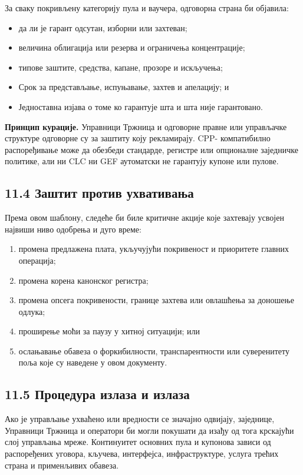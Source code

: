 \documentclass[11pt]{article}
\begin{document}
За сваку покривљену категорију пула и ваучера, одговорна страна би објавила:

\begin{itemize}[leftmargin=*]
\item да ли је гарант одсутан, изборни или захтеван;
\item величина облигација или резерва и ограничења концентрације;
\item типове заштите, средства, капане, прозоре и искључења;
\item Срок за представљање, испуњавање, захтев и апелацију; и
\item Једноставна изјава о томе ко гарантује шта и шта није гарантовано.
\end{itemize}
\textbf{Принцип курације.} Управници Тржница и одговорне правне или управљачке структуре одговорне су за заштиту коју рекламирају. CPP- компатибилно распоређивање може да обезбеди стандарде, регистре или опционалне заједничке политике, али ни CLC ни GEF аутоматски не гарантују купоне или пулове.

\subsection*{11.4 Заштит против ухвативања}

Према овом шаблону, следеће би биле критичне акције које захтевају усвојен највиши ниво одобрења и дуго време:

\begin{enumerate}[leftmargin=*]
\item промена предлажена плата, укључујући покривеност и приоритете главних операција;
\item промена корена канонског регистра;
\item промена опсега покривености, границе захтева или овлашћења за доношење одлука;
\item проширење моћи за паузу у хитној ситуацији; или
\item ослањавање обавеза о форкибилности, транспарентности или суверенитету поља које су наведене у овом документу.
\end{enumerate}
\subsection*{11.5 Процедура излаза и излаза}

Ако је управљање ухваћено или вредности се значајно одвијају, заједнице, Управници Тржница и оператори би могли покушати да изађу од тога крскајући слој управљања мреже. Континуитет основних пула и купонова зависи од распоређених уговора, кључева, интерфејса, инфраструктуре, услуга трећих страна и применљивих обавеза.
\end{document}
